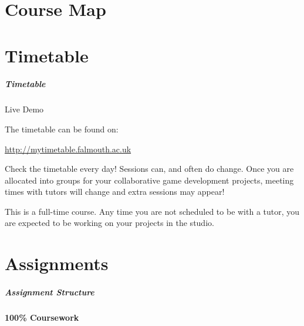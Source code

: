 \part{Course Map}
\frame{\partpage}




\part{Timetable}
\frame{\partpage}

\begin{frame}
	\frametitle{Timetable}
	
	Live Demo
	
	\vspace{3em}
	
	The timetable can be found on:
	
	\vspace{0.5em}
	
	\indent \url{http://mytimetable.falmouth.ac.uk}
	
	\vspace{0.5em}
	
	Check the timetable every day! Sessions can, and often do change. Once you are allocated into groups for your collaborative game development projects, meeting times with tutors will change and extra sessions may appear!
	
	\vspace{0.5em}
	
	 This is a full-time course. Any time you are not scheduled to be with a tutor, you are expected to be working on your projects in the studio.
	
\end{frame}

\part{Assignments}
\frame{\partpage}

\begin{frame}
	\frametitle{Assignment Structure}
	
	\begin{Huge}
		\begin{center}
			\textbf{100\% Coursework}
		\end{center}
	\end{Huge}

\end{frame}

